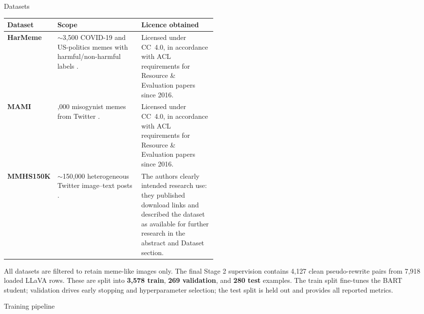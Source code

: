 \documentclass[final]{beamer}
\newlength{\colwidth}
\newcommand{\smallgap}{\vspace{0.18em}}
\begin{document}
\begin{frame}[t]
\begin{columns}[t]
\begin{column}{\colwidth}
    \begin{block}{Datasets}
    \small
    \begin{tabularx}{\linewidth}{>{\bfseries}p{0.14\linewidth} >{\raggedright\arraybackslash}X >{\scriptsize\raggedright\arraybackslash}p{0.36\linewidth}}
        \toprule
        Dataset & Scope & Licence obtained\\
        \midrule
        HarMeme & \(\sim\)3,500 COVID-19 and US-politics memes with harmful/non-harmful labels
        \cite{pramanick2021harmeme}. & Licensed under CC~4.0, in accordance with ACL requirements for Resource \& Evaluation papers since 2016.\\
        MAMI & 10,000 misogynist memes from Twitter \cite{fersini2022mami}. &
        Licensed under CC~4.0, in accordance with ACL requirements for Resource \& Evaluation papers since 2016.\\
        MMHS150K & \(\sim\)150,000 heterogeneous Twitter image--text posts
        \cite{gomez2020multimodal}. & The authors clearly intended research use: they published download links and described the dataset as available for further research in the abstract and Dataset section.\\
        \bottomrule
    \end{tabularx}

    \smallgap
    All datasets are filtered to retain meme-like images only. The final Stage 2
    supervision contains 4,127 clean pseudo-rewrite pairs from 7,918 loaded
    LLaVA rows. These are split into \textbf{3,578 train}, \textbf{269 validation},
    and \textbf{280 test} examples. The train split fine-tunes the BART student;
    validation drives early stopping and hyperparameter selection; the test split
    is held out and provides all reported metrics.
    \end{block}

    \begin{block}{Training pipeline}
    \begin{center}
        
    \end{center}


\end{block}
\end{column}
\end{columns}
\end{frame}
\end{document}
